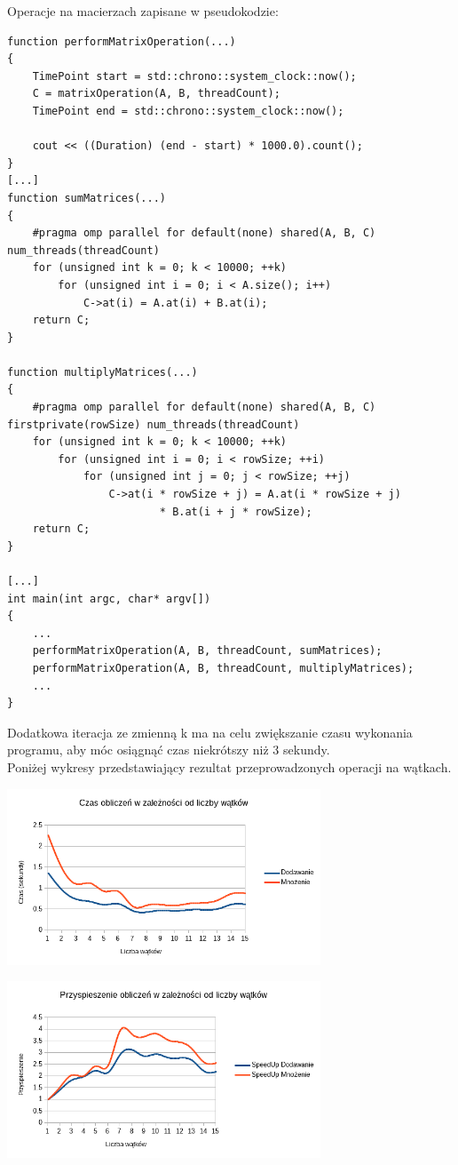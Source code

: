 \documentclass[a4paper,12pt]{article}
\begin{document}
Operacje na macierzach zapisane w pseudokodzie:
\begin{lstlisting}
function performMatrixOperation(...)
{
	TimePoint start = std::chrono::system_clock::now();
	C = matrixOperation(A, B, threadCount);
	TimePoint end = std::chrono::system_clock::now();

	cout << ((Duration) (end - start) * 1000.0).count();
}
[...]
function sumMatrices(...)
{
	#pragma omp parallel for default(none) shared(A, B, C) num_threads(threadCount)
	for (unsigned int k = 0; k < 10000; ++k)
		for (unsigned int i = 0; i < A.size(); i++)
			C->at(i) = A.at(i) + B.at(i);
	return C;
}

function multiplyMatrices(...)
{
	#pragma omp parallel for default(none) shared(A, B, C) firstprivate(rowSize) num_threads(threadCount)
	for (unsigned int k = 0; k < 10000; ++k)
		for (unsigned int i = 0; i < rowSize; ++i)
			for (unsigned int j = 0; j < rowSize; ++j)
				C->at(i * rowSize + j) = A.at(i * rowSize + j)
						* B.at(i + j * rowSize);
	return C;
}

[...]
int main(int argc, char* argv[])
{
	...
	performMatrixOperation(A, B, threadCount, sumMatrices);
	performMatrixOperation(A, B, threadCount, multiplyMatrices);
	...
}
\end{lstlisting}
Dodatkowa iteracja ze zmienną k ma na celu zwiększanie czasu wykonania programu, aby móc osiągnąć czas niekrótszy niż 3 sekundy.
\\

Poniżej wykresy przedstawiający rezultat przeprowadzonych operacji na wątkach.
\\
\begin{center}
\includegraphics[width=0.7\textwidth]{data/czas.png}
\end{center}

\begin{center}
\includegraphics[width=0.7\textwidth]{data/przysp.png}
\end{center}
\end{document}
